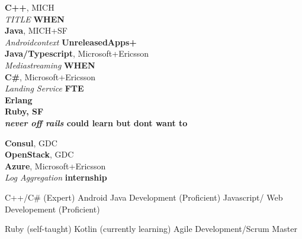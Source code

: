 \documentclass[margin,line]{res}
\begin{document}
\begin{resume}
{\bf C++}, MICH\\
{\em TITLE} \hfill {\bf  WHEN}\\

{\bf Java}, MICH+SF\\
{\em Androidcontext} \hfill {\bf UnreleasedApps+ }\\

{\bf Java/Typescript}, Microsoft+Ericsson\\
{\em Mediastreaming } \hfill {\bf WHEN}\\

{\bf {C\#}}, Microsoft+Ericsson\\
{\em Landing Service} \hfill {\bf  FTE}\\

\bf Erlang\\

{\bf Ruby}, SF\\
{\em never off rails} \hfill could learn but dont want to

{\bf Consul}, GDC\\
{\bf OpenStack}, GDC\\

{\bf Azure}, Microsoft+Ericsson\\
{\em Log Aggregation} \hfill {\bf internship}\\
{\em }

C++/C\# (Expert)
Android Java Development (Proficient)
Javascript/ Web Developement (Proficient) 

Ruby (self-taught)
Kotlin (currently learning)
Agile Development/Scrum Master

\end{resume}
\end{document}
